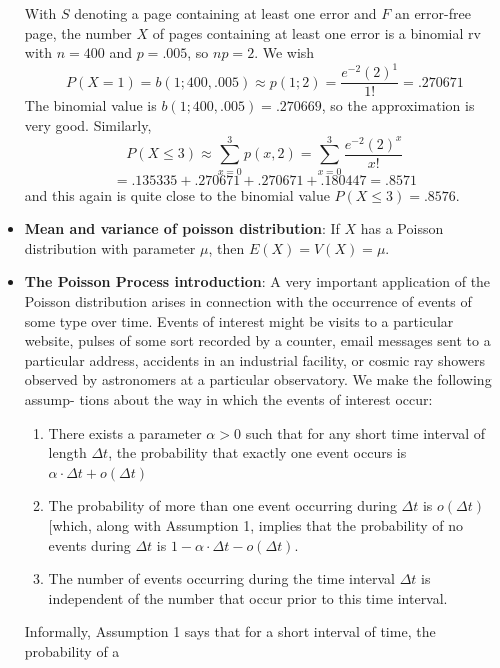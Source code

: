 \documentclass{report}
\begin{document}
\begin{itemize}
        \bigbreak \noindent 
        With \( S \) denoting a page containing at least one error and \( F \) an error-free page, the number \( X \) of pages containing at least one error is a binomial rv with \( n = 400 \) and \( p = .005 \), so \( np = 2 \). We wish
        \[
            P(X = 1) = b(1; 400, .005) \approx p(1; 2) = \frac{e^{-2}(2)^1}{1!} = .270671
        \]
        The binomial value is \( b(1; 400, .005) = .270669 \), so the approximation is very good.
        \bigbreak \noindent 
        Similarly,
        \[
            P(X \leq 3) \approx \sum_{x=0}^{3} p(x, 2) = \sum_{x=0}^{3} \frac{e^{-2} (2)^x}{x!}
        \]
        \bigbreak \noindent 
        \[
            = .135335 + .270671 + .270671 + .180447 = .8571
        \]
        and this again is quite close to the binomial value \( P(X \leq 3) = .8576 \).
    \item \textbf{Mean and variance of poisson distribution}:
        If \( X \) has a Poisson distribution with parameter \( \mu \), then \( E(X) = V(X) = \mu \).
    \item \textbf{The Poisson Process introduction}:
        A very important application of the Poisson distribution arises in connection with the
        occurrence of events of some type over time. Events of interest might be visits to a
        particular website, pulses of some sort recorded by a counter, email messages sent
        to a particular address, accidents in an industrial facility, or cosmic ray showers
        observed by astronomers at a particular observatory. We make the following assump-
        tions about the way in which the events of interest occur:
        \begin{enumerate}
            \item There exists a parameter $\alpha > 0$ such that for any short time interval of length $\Delta t$, the probability that exactly one event occurs is $\alpha \cdot \Delta t + o(\Delta t)$
            \item The probability of more than one event occurring during $\Delta t$ is $o(\Delta t)$ [which, along with Assumption 1, implies that the probability of no events during $\Delta t$ is $1 - \alpha \cdot \Delta t - o(\Delta t)$.
            \item The number of events occurring during the time interval $\Delta t$ is independent of the number that occur prior to this time interval.
        \end{enumerate}
        Informally, Assumption 1 says that for a short interval of time, the probability of a

\end{itemize}
\end{document}
